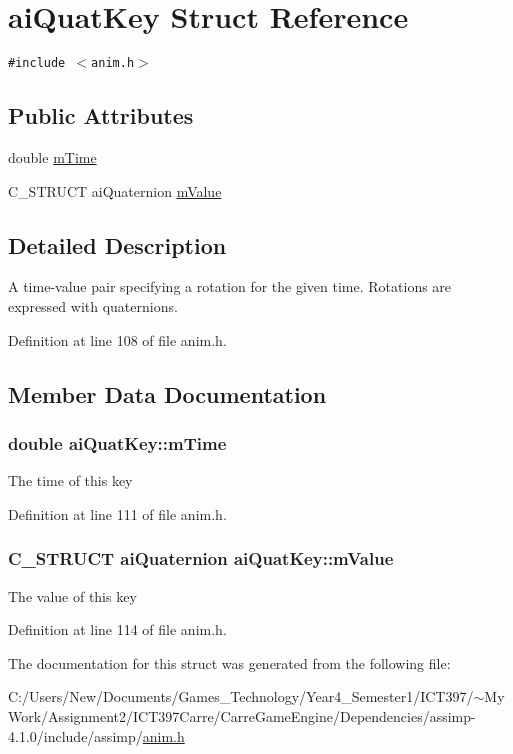 \hypertarget{structai_quat_key}{
\section{aiQuatKey Struct Reference}
\label{structai_quat_key}
}
{\tt \#include $<$anim.h$>$}

\subsection*{Public Attributes}
\begin{CompactItemize}
\item 
double \hyperlink{structai_quat_key_fb56b697e491c918bdeb1b32d03bbcf8}{mTime}
\item 
C\_\-STRUCT aiQuaternion \hyperlink{structai_quat_key_08bf706065137951fd89c5914bb5a2aa}{mValue}
\end{CompactItemize}


\subsection{Detailed Description}
A time-value pair specifying a rotation for the given time. Rotations are expressed with quaternions. 

Definition at line 108 of file anim.h.

\subsection{Member Data Documentation}
\hypertarget{structai_quat_key_fb56b697e491c918bdeb1b32d03bbcf8}{
\subsubsection[mTime]{\setlength{\rightskip}{0pt plus 5cm}double {\bf aiQuatKey::mTime}}}
\label{structai_quat_key_fb56b697e491c918bdeb1b32d03bbcf8}


The time of this key 

Definition at line 111 of file anim.h.\hypertarget{structai_quat_key_08bf706065137951fd89c5914bb5a2aa}{
\subsubsection[mValue]{\setlength{\rightskip}{0pt plus 5cm}C\_\-STRUCT aiQuaternion {\bf aiQuatKey::mValue}}}
\label{structai_quat_key_08bf706065137951fd89c5914bb5a2aa}


The value of this key 

Definition at line 114 of file anim.h.

The documentation for this struct was generated from the following file:\begin{CompactItemize}
\item 
C:/Users/New/Documents/Games\_\-Technology/Year4\_\-Semester1/ICT397/$\sim$My Work/Assignment2/ICT397Carre/CarreGameEngine/Dependencies/assimp-4.1.0/include/assimp/\hyperlink{anim_8h}{anim.h}\end{CompactItemize}
